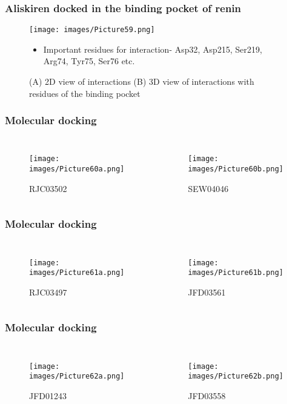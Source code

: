 \documentclass{beamer}
\begin{document}
\begin{frame}
\frametitle{\textbf{Aliskiren docked in the binding pocket of renin}}
\begin{figure}
\texttt{[image: images/Picture59.png]}
\caption{(A) 2D view of interactions (B) 3D view of interactions with residues of the binding pocket}
\begin{itemize}
\item Important residues for interaction- Asp32, Asp215, Ser219, Arg74, Tyr75, Ser76 etc.
\end{itemize}
\end{figure}
\end{frame}

\begin{frame}
\frametitle{\textbf{Molecular docking}}
\begin{columns}[c] 
\begin{figure}
\texttt{[image: images/Picture60a.png]}
\caption{RJC03502}
\end{figure}
\begin{figure}
\texttt{[image: images/Picture60b.png]}
\caption{SEW04046}
\end{figure}
\end{columns}
\end{frame}

\begin{frame}
\frametitle{\textbf{Molecular docking}}
\begin{columns}[c] 
\begin{figure}
\texttt{[image: images/Picture61a.png]}
\caption{RJC03497}
\end{figure}
\begin{figure}
\texttt{[image: images/Picture61b.png]}
\caption{JFD03561}
\end{figure}
\end{columns}
\end{frame}

\begin{frame}
\frametitle{\textbf{Molecular docking}}
\begin{columns}[c] 
\begin{figure}
\texttt{[image: images/Picture62a.png]}
\caption{JFD01243}
\end{figure}
\begin{figure}
\texttt{[image: images/Picture62b.png]}
\caption{JFD03558}
\end{figure}
\end{columns}
\end{frame}
\end{document}
